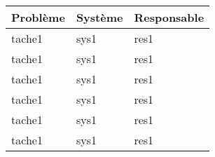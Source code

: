 \begin{tabularx}{\linewidth}{
    |>{\hsize=2.0\hsize}X|%
    >{\hsize=0.5\hsize}X|%
    >{\hsize=0.5\hsize}X|%
  }
    \hline
    \textbf{Problème} & \textbf{Système} & \textbf{Responsable} \\\hline
    tache1 & sys1 & res1 \\\hline
    tache1 & sys1 & res1 \\\hline
    tache1 & sys1 & res1 \\\hline
    tache1 & sys1 & res1 \\\hline
    tache1 & sys1 & res1 \\\hline
    tache1 & sys1 & res1 \\\hline
  \end{tabularx}
     